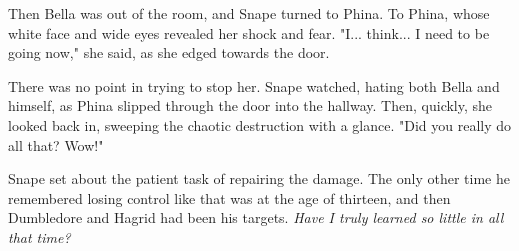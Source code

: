 \documentclass[a4paper,11pt]{article}
\begin{document}
Then Bella was out of the room, and Snape turned to Phina. To Phina, whose white face and wide eyes revealed her shock and fear. "I... think... I need to be going now," she said, as she edged towards the door.

There was no point in trying to stop her. Snape watched, hating both Bella and himself, as Phina slipped through the door into the hallway. Then, quickly, she looked back in, sweeping the chaotic destruction with a glance. "Did you really do all that? Wow!"

Snape set about the patient task of repairing the damage. The only other time he remembered losing control like that was at the age of thirteen, and then Dumbledore and Hagrid had been his targets. \emph{Have I truly learned so little in all that time?}
\end{document}
